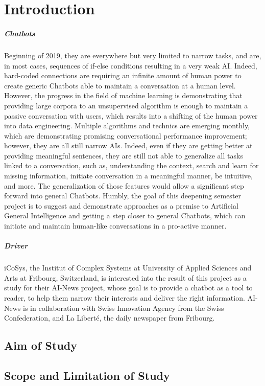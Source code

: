 \chapter{Introduction}
\label{chap:introduction}

\paragraph{Chatbots} Beginning of 2019, they are everywhere but very limited to narrow tasks, and are, in most cases, sequences of if-else conditions resulting in a very weak AI. Indeed, hard-coded connections are requiring an infinite amount of human power to create generic Chatbots able to maintain a conversation at a human level. However, the progress in the field of machine learning is demonstrating that providing large corpora to an unsupervised algorithm is enough to maintain a passive conversation with users, which results into a shifting of the human power into data engineering. Multiple algorithms and technics are emerging monthly, which are demonstrating promising conversational performance improvement; however, they are all still narrow AIs. Indeed, even if they are getting better at providing meaningful sentences, they are still not able to generalize all tasks linked to a conversation, such as, understanding the context, search and learn for missing information, initiate conversation in a meaningful manner, be intuitive, and more. The generalization of those features would allow a significant step forward into general Chatbots. Humbly, the goal of this deepening semester project is to suggest and demonstrate approaches as a premise to Artificial General Intelligence and getting a step closer to general Chatbots, which can initiate and maintain human-like conversations in a pro-active manner. 
\paragraph{Driver} iCoSys, the Institut of Complex Systems at University of Applied Sciences and Arts at Fribourg, Switzerland, is interested into the result of this project as a study for their AI-News project, whose goal is to provide a chatbot as a tool to reader, to help them narrow their interests and deliver the right information. AI-News is in collaboration with Swiss Innovation Agency from the Swiss Confederation, and La Liberté, the daily newspaper from Fribourg.

\section{Aim of Study}

\section{Scope and Limitation of Study}
